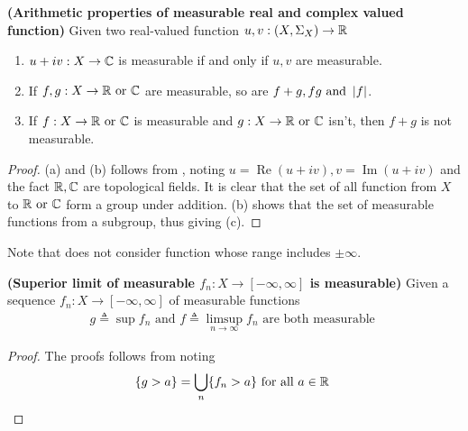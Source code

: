 \documentclass{report}
\begin{document}
\begin{theorem}
\label{Btsa}
\textbf{(Arithmetic properties of measurable real and complex valued function)} Given two real-valued function $u,v:(X,\Sigma_X)\rightarrow \mathbb{R}$
\begin{enumerate}[label=(\alph*)]
  \item  $u+iv:X\rightarrow \mathbb{C}$ is measurable if and only if $u,v$ are measurable.
  \item If  $f,g:X\rightarrow \mathbb{R}\text{ or }\mathbb{C}$ are measurable, so are $f+g,fg\text{ and }\left|f\right|$.
  \item If $f:X\rightarrow \mathbb{R}\text{ or }\mathbb{C}$ is measurable and $g:X\rightarrow \mathbb{R}\text{ or }\mathbb{C}$ isn't, then $f+g$ is not measurable.
\end{enumerate}
\end{theorem}
\begin{proof}
(a) and (b) follows from , noting $u=\operatorname{Re}(u+iv),v=\operatorname{Im}(u+iv)$ and the fact $\mathbb{R},\mathbb{C}$ are topological fields. It is clear that the set of all function from  $X$ to $\mathbb{R}\text{ or }\mathbb{C}$ form a group under addition. (b) shows that the set of measurable functions from a subgroup, thus giving (c).
\end{proof}
\begin{mdframed}
Note that  does not consider function whose range includes $\pm \infty$. 
\end{mdframed}
\begin{theorem}
\label{Slm}
\textbf{(Superior limit of measurable $f_n:X\rightarrow [-\infty,\infty]$ is measurable)} Given a sequence $f_n:X\rightarrow [-\infty, \infty]$ of measurable functions
\begin{align*}
g\triangleq \sup f_n \text{ and }f\triangleq \limsup_{n\to\infty} f_n\text{ are both measurable }
\end{align*}
\end{theorem}
\begin{proof}
The proofs follows from noting 
\begin{align*}
\{ g>a \}=\bigcup_n \{ f_n>a \}\text{ for all $a\in\mathbb{R}$ }
\end{align*}
\end{proof}
\end{document}
